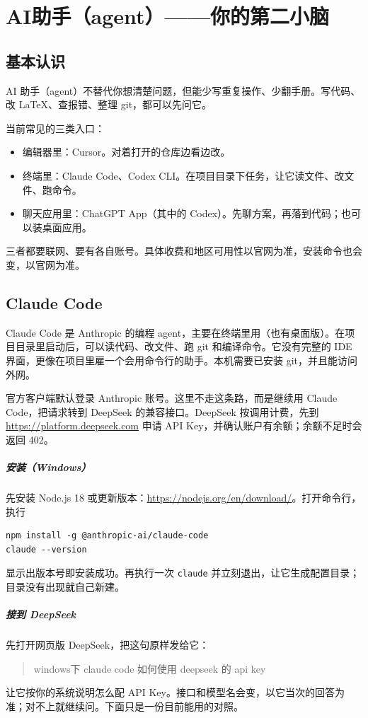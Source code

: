 \chapter{AI助手（agent）——你的第二小脑}
\section{基本认识}
AI 助手（agent）不替代你想清楚问题，但能少写重复操作、少翻手册。写代码、改 \LaTeX、查报错、整理 git，都可以先问它。

当前常见的三类入口：
\begin{itemize}
\item 编辑器里：Cursor。对着打开的仓库边看边改。
\item 终端里：Claude Code、Codex CLI。在项目目录下任务，让它读文件、改文件、跑命令。
\item 聊天应用里：ChatGPT App（其中的 Codex）。先聊方案，再落到代码；也可以装桌面应用。
\end{itemize}
三者都要联网、要有各自账号。具体收费和地区可用性以官网为准，安装命令也会变，以官网为准。




\section{Claude Code}
Claude Code 是 Anthropic 的编程 agent，主要在终端里用（也有桌面版）。在项目目录里启动后，可以读代码、改文件、跑 git 和编译命令。它没有完整的 IDE 界面，更像在项目里雇一个会用命令行的助手。本机需要已安装 git，并且能访问外网。

官方客户端默认登录 Anthropic 账号。这里不走这条路，而是继续用 Claude Code，把请求转到 DeepSeek 的兼容接口。DeepSeek 按调用计费，先到 \url{https://platform.deepseek.com} 申请 API Key，并确认账户有余额；余额不足时会返回 402。

\paragraph{安装（Windows）}
先安装 Node.js 18 或更新版本：\url{https://nodejs.org/en/download/}。打开命令行，执行
\begin{verbatim}
npm install -g @anthropic-ai/claude-code
claude --version
\end{verbatim}
显示出版本号即安装成功。再执行一次 \verb|claude| 并立刻退出，让它生成配置目录；目录没有出现就自己新建。

\paragraph{接到 DeepSeek}
先打开网页版 DeepSeek，把这句原样发给它：
\begin{quote}
windows下 claude code 如何使用 deepseek 的 api key
\end{quote}
让它按你的系统说明怎么配 API Key。接口和模型名会变，以它当次的回答为准；对不上就继续问。下面只是一份目前能用的对照。

